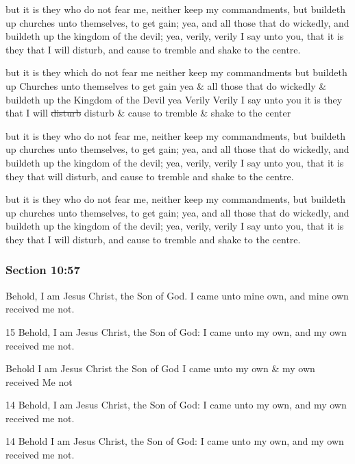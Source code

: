 		\begin{framed}
		\scriptsize
			\begin{compactdesc}
				\item[JSP] but it is they who do not fear me, neither keep my commandments, but buildeth up churches unto themselves, to get gain; yea, and all those that do wickedly, and buildeth up the kingdom of the devil; yea, verily, verily I say unto you, that it is they that I will disturb, and cause to tremble and shake to the centre.
				\item[RB1] but it is they which do not fear me neither keep my commandments but buildeth up Churches unto themselves to get gain yea \& all those that do wickedly \& buildeth up the Kingdom of the Devil yea Verily Verily I say unto you it is they that I will \sout{disturb} disturb \& cause to tremble \& shake to the center
				\item[DC 1835] but it is they who do not fear me, neither keep my commandments, but buildeth up churches unto themselves, to get gain; yea, and all those that do wickedly, and buildeth up the kingdom of the devil; yea, verily, verily I say unto you, that it is they that will disturb, and cause to tremble and shake to the centre.
				\item[DC 1844] but it is they who do not fear me, neither keep my commandments, but buildeth up churches unto themselves, to get gain; yea, and all those that do wickedly, and buildeth up the kingdom of the devil; yea, verily, verily I say unto you, that it is they that I will disturb, and cause to tremble and shake to the centre.
			\end{compactdesc}
		\end{framed}

	\subsubsection{Section 10:57} %
		\label{DC10-57}

		Behold, I am Jesus Christ, the Son of God.  I came unto mine own, and mine own received me not.

		\begin{framed}
		\scriptsize
			\begin{compactdesc}
				\item[JSP] 15 Behold, I am Jesus Christ, the Son of God: I came unto my own, and my own received me not.
				\item[RB1] Behold I am Jesus Christ the Son of God I came unto my own \& my own received Me not
				\item[DC 1835] 14 Behold, I am Jesus Christ, the Son of God: I came unto my own, and my own received me not.
				\item[DC 1844] 14 Behold I am Jesus Christ, the Son of God: I came unto my own, and my own received me not.
			\end{compactdesc}
		\end{framed}

